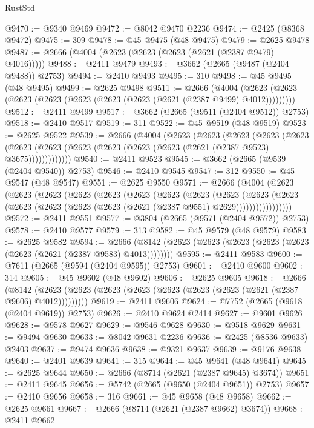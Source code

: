 \begin{lexlean}{RustStd}
\begin{coremodule}
@9470 := @9340 @9469
@9472 := @8042 @9470 @2236
@9474 := @2425 (@8368 @9472)
@9475 := 309
@9478 := @45 @9475 (@48 @9475)
@9479 := @2625 @9478
@9487 := @2666 (@4004 (@2623 (@2623 (@2623 (@2621 (@2387 @9479) @4016)))))
@9488 := @2411 @9479
@9493 := @3662 (@2665 (@9487 (@2404 @9488)) @2753)
@9494 := @2410 @9493
@9495 := 310
@9498 := @45 @9495 (@48 @9495)
@9499 := @2625 @9498
@9511 := @2666
    (@4004 (@2623 (@2623 (@2623 (@2623 (@2623 (@2623 (@2623 (@2621 (@2387 @9499) @4012)))))))))
@9512 := @2411 @9499
@9517 := @3662 (@2665 (@9511 (@2404 @9512)) @2753)
@9518 := @2410 @9517
@9519 := 311
@9522 := @45 @9519 (@48 @9519)
@9523 := @2625 @9522
@9539 := @2666
    (@4004
      (@2623
        (@2623
          (@2623
            (@2623
              (@2623
                (@2623 (@2623 (@2623 (@2623 (@2623 (@2623 (@2621 (@2387 @9523) @3675)))))))))))))
@9540 := @2411 @9523
@9545 := @3662 (@2665 (@9539 (@2404 @9540)) @2753)
@9546 := @2410 @9545
@9547 := 312
@9550 := @45 @9547 (@48 @9547)
@9551 := @2625 @9550
@9571 := @2666
    (@4004
      (@2623
        (@2623
          (@2623
            (@2623
              (@2623
                (@2623
                  (@2623
                    (@2623
                      (@2623
                        (@2623
                          (@2623
                            (@2623 (@2623 (@2623 (@2623 (@2621 (@2387 @9551) @2629)))))))))))))))))
@9572 := @2411 @9551
@9577 := @3804 (@2665 (@9571 (@2404 @9572)) @2753)
@9578 := @2410 @9577
@9579 := 313
@9582 := @45 @9579 (@48 @9579)
@9583 := @2625 @9582
@9594 := @2666 (@8142 (@2623 (@2623 (@2623 (@2623 (@2623 (@2623 (@2621 (@2387 @9583) @4013))))))))
@9595 := @2411 @9583
@9600 := @7611 (@2665 (@9594 (@2404 @9595)) @2753)
@9601 := @2410 @9600
@9602 := 314
@9605 := @45 @9602 (@48 @9602)
@9606 := @2625 @9605
@9618 := @2666
    (@8142 (@2623 (@2623 (@2623 (@2623 (@2623 (@2623 (@2623 (@2621 (@2387 @9606) @4012)))))))))
@9619 := @2411 @9606
@9624 := @7752 (@2665 (@9618 (@2404 @9619)) @2753)
@9626 := @2410 @9624 @2414
@9627 := @9601 @9626
@9628 := @9578 @9627
@9629 := @9546 @9628
@9630 := @9518 @9629
@9631 := @9494 @9630
@9633 := @8042 @9631 @2236
@9636 := @2425 (@8536 @9633) @2403
@9637 := @9474 @9636
@9638 := @9321 @9637
@9639 := @9176 @9638
@9640 := @2401 @9639
@9641 := 315
@9644 := @45 @9641 (@48 @9641)
@9645 := @2625 @9644
@9650 := @2666 (@8714 (@2621 (@2387 @9645) @3674))
@9651 := @2411 @9645
@9656 := @5742 (@2665 (@9650 (@2404 @9651)) @2753)
@9657 := @2410 @9656
@9658 := 316
@9661 := @45 @9658 (@48 @9658)
@9662 := @2625 @9661
@9667 := @2666 (@8714 (@2621 (@2387 @9662) @3674))
@9668 := @2411 @9662

\end{coremodule}
\end{lexlean}

